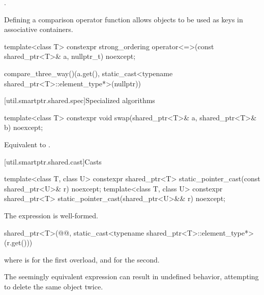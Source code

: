 \begin{itemdescr}
\pnum
\returns
{}.

\pnum
\begin{note}
Defining a comparison operator function allows  objects
to be used as keys in associative containers.
\end{note}
\end{itemdescr}

%
\begin{itemdecl}
template<class T>
  constexpr strong_ordering operator<=>(const shared_ptr<T>& a, nullptr_t) noexcept;
\end{itemdecl}

\begin{itemdescr}
\pnum
\returns
\begin{codeblock}
compare_three_way()(a.get(), static_cast<typename shared_ptr<T>::element_type*>(nullptr))
\end{codeblock}
\end{itemdescr}

[util.smartptr.shared.spec]{Specialized algorithms}

%
\begin{itemdecl}
template<class T>
  constexpr void swap(shared_ptr<T>& a, shared_ptr<T>& b) noexcept;
\end{itemdecl}

\begin{itemdescr}
\pnum
\effects
Equivalent to .
\end{itemdescr}

[util.smartptr.shared.cast]{Casts}

%
\begin{itemdecl}
template<class T, class U>
  constexpr shared_ptr<T> static_pointer_cast(const shared_ptr<U>& r) noexcept;
template<class T, class U>
  constexpr shared_ptr<T> static_pointer_cast(shared_ptr<U>&& r) noexcept;
\end{itemdecl}

\begin{itemdescr}
\pnum
\mandates
The expression  is well-formed.

\pnum
\returns
\begin{codeblock}
shared_ptr<T>(@@, static_cast<typename shared_ptr<T>::element_type*>(r.get()))
\end{codeblock}
where  is  for the first overload, and
 for the second.

\pnum
\begin{note}
The seemingly equivalent expression
can result in undefined behavior, attempting to delete the
same object twice.
\end{note}
\end{itemdescr}

